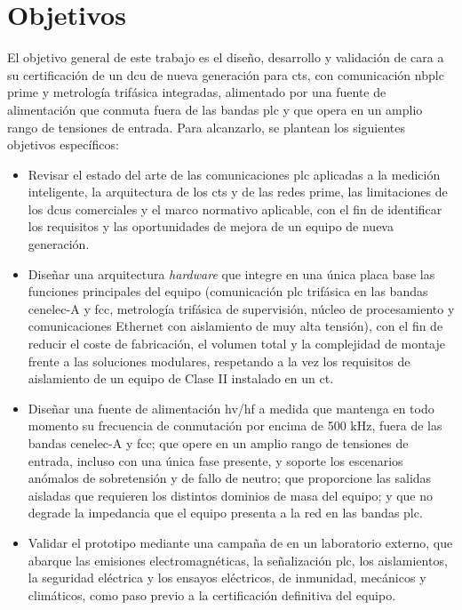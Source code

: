 \section{Objetivos}
\label{sec:objetivos}

El objetivo general de este trabajo es el diseño, desarrollo y validación de cara a su certificación de un \gls{dcu} de nueva generación para \glspl{ct}, con comunicación \gls{nbplc} \gls{prime} y metrología trifásica integradas, alimentado por una fuente de alimentación que conmuta fuera de las bandas \gls{plc} y que opera en un amplio rango de tensiones de entrada. Para alcanzarlo, se plantean los siguientes objetivos específicos:

\begin{itemize}
    \item Revisar el estado del arte de las comunicaciones \gls{plc} aplicadas a la medición inteligente, la arquitectura de los \glspl{ct} y de las redes \gls{prime}, las limitaciones de los \glspl{dcu} comerciales y el marco normativo aplicable, con el fin de identificar los requisitos y las oportunidades de mejora de un equipo de nueva generación.

    \item Diseñar una arquitectura \textit{hardware} que integre en una única placa base las funciones principales del equipo (comunicación \gls{plc} trifásica en las bandas \gls{cenelec}-A y \gls{fcc}, metrología trifásica de supervisión, núcleo de procesamiento y comunicaciones Ethernet con aislamiento de muy alta tensión), con el fin de reducir el coste de fabricación, el volumen total y la complejidad de montaje frente a las soluciones modulares, respetando a la vez los requisitos de aislamiento de un equipo de Clase II instalado en un \gls{ct}.

    \item Diseñar una fuente de alimentación \gls{hv}/\gls{hf} a medida que mantenga en todo momento su frecuencia de conmutación por encima de 500 kHz, fuera de las bandas \gls{cenelec}-A y \gls{fcc}; que opere en un amplio rango de tensiones de entrada, incluso con una única fase presente, y soporte los escenarios anómalos de sobretensión y de fallo de neutro; que proporcione las salidas aisladas que requieren los distintos dominios de masa del equipo; y que no degrade la impedancia que el equipo presenta a la red en las bandas \gls{plc}.

    \item Validar el prototipo mediante una campaña de  en un laboratorio externo, que abarque las emisiones electromagnéticas, la señalización \gls{plc}, los aislamientos, la seguridad eléctrica y los ensayos eléctricos, de inmunidad, mecánicos y climáticos, como paso previo a la certificación definitiva del equipo.


\end{itemize}
